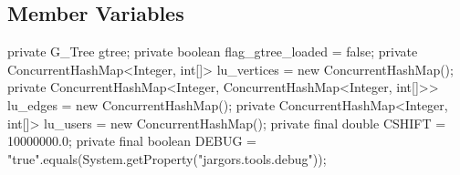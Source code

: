 \subsection{Member Variables}
\nwenddocs{}\endmoddef{}
private G_Tree gtree;
private boolean flag_gtree_loaded = false;
private ConcurrentHashMap<Integer, int[]> lu_vertices = new ConcurrentHashMap();
private ConcurrentHashMap<Integer,
    ConcurrentHashMap<Integer, int[]>>    lu_edges    = new ConcurrentHashMap();
private ConcurrentHashMap<Integer, int[]> lu_users    = new ConcurrentHashMap();
private final double CSHIFT = 10000000.0;
private final boolean DEBUG = "true".equals(System.getProperty("jargors.tools.debug"));
\eatline
{}\nwendcode{}\nwdocspar
